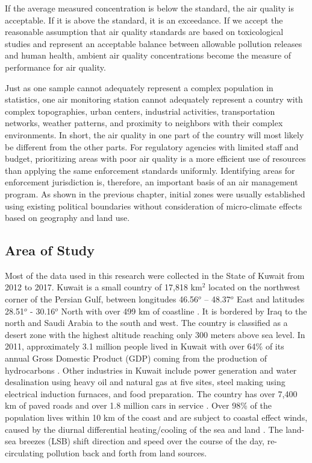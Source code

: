If the average measured concentration is below the standard, the air quality is acceptable. If it is above the standard, it is an exceedance. If we accept the reasonable assumption that air quality standards are based on  toxicological studies and represent an acceptable balance between allowable pollution releases and human health, ambient air quality concentrations become the measure of performance for air quality.

Just as one sample cannot adequately represent a complex population in statistics, one air monitoring station cannot adequately represent a country with complex topographies, urban centers, industrial activities, transportation networks, weather patterns, and proximity to neighbors with their complex environments.  In short, the air quality in one part of the country will most likely be different from the other parts. For regulatory agencies with limited staff and budget, prioritizing areas with poor air quality is a more efficient use of resources than applying the same enforcement standards uniformly. Identifying areas for enforcement jurisdiction is, therefore, an important basis of an air management program. As shown in the previous chapter, initial zones were usually established using existing political boundaries without consideration of micro-climate effects based on geography and land use.  

\subsection{Area of Study}
Most of the data used in this research were collected in the State of Kuwait from 2012 to 2017. Kuwait is a small country of 17,818 km$^{2}$ located on the northwest corner of the Persian Gulf, between longitudes 46.56$^{o}$ – 48.37$^{o}$ East and latitudes 28.51$^{o}$ - 30.16$^{o}$ North with over 499 km of coastline \citep{CIA2015}. It is bordered by Iraq to the north and Saudi Arabia to the south and west. The country is classified as a desert zone with the highest altitude reaching only 300 meters above sea level.   In 2011, approximately 3.1 million people lived in Kuwait \citep{CSB2017} with over 64\% of its annual Gross Domestic Product (GDP) coming from the production of hydrocarbons \citep{KAMCO2013}.  Other industries in Kuwait include power generation and water desalination using heavy oil and natural gas at five sites, steel making using electrical induction furnaces, and food preparation.  The country has over 7,400 km of paved roads and over 1.8 million cars in service \citep{CSB2014}.  Over 98\% of the population lives within 10 km of the coast and are subject to coastal effect winds, caused by the diurnal differential heating/cooling of the sea and land \citep{Crosman2010, Cuxart2014}.  The land-sea breezes (LSB) shift direction and speed over the course of the day, re-circulating pollution back and forth from land sources.

